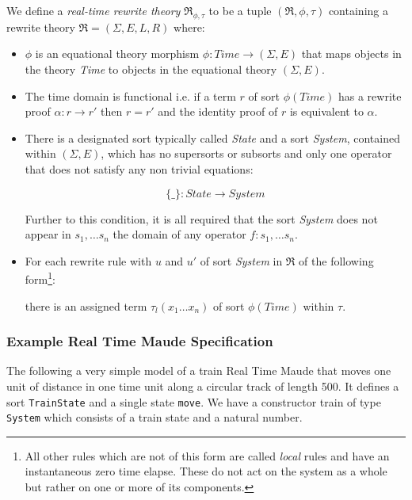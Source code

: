 \medskip
\begin{mydef}
We define a \emph{real-time rewrite theory} $\mathfrak{R}_{\phi,\tau}$ to be a tuple $(\mathfrak{R}, \phi,\tau)$ containing a rewrite theory $\mathfrak{R} = (\Sigma, E,L,R) $ where:

\begin{itemize}
\item $\phi$ is an equational theory morphism $\phi : \mathit{Time} \to (\Sigma, E)$ that maps objects in the theory \textit{Time} to objects in the equational theory $(\Sigma , E)$.

\item The time domain is functional i.e. if a term $r$ of sort $\phi(Time)$  has a rewrite proof $\alpha: r \to r'$ then $r = r'$ and the identity proof of $r$ is equivalent to $\alpha$.

\item There is a designated sort typically called \textit{State} and a sort \textit{System}, contained within $(\Sigma, E)$, which has no supersorts or subsorts and only one operator that does not satisfy any non trivial equations:

$$\{\_\}: State \to System$$

Further to this condition, it is all required that the sort \textit{System} does not appear in $s_1, \ldots s_n$ the domain  of  any operator $f: s_1, \ldots s_n$.

\item For each rewrite rule with $u$ and $u'$ of sort \textit{System} in $\mathfrak{R}$ of the following form\footnote{All other rules which are not of this form are called \emph{local} rules and have an instantaneous zero time elapse. These do not act on the system as a whole but rather on one or more of its components.}:

there is an assigned term $\tau_l(x_1 \ldots x_n)$ of sort $\phi(Time)$ within $\tau$.

\end{itemize}
\end{mydef}
 
\subsubsection*{Example Real Time Maude Specification}
The following a very simple model of a train Real Time Maude that moves one unit of distance in one time unit along a circular track of length 500. It defines a sort \texttt{TrainState} and a single state \texttt{move}. We have a constructor train of type \texttt{System} which consists of a train state and a natural number.  

